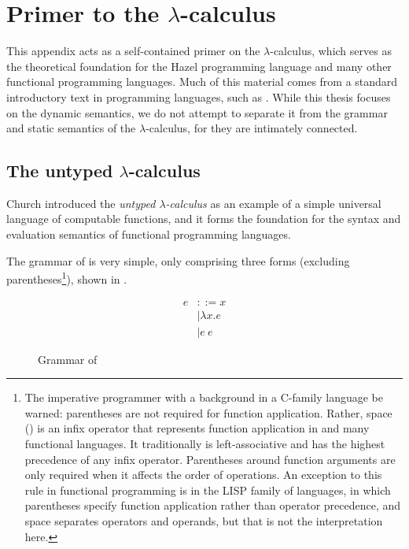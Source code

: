 \chapter{Primer to the $\lambda$-calculus}
\label{sec:lambda-calculus-primer}

This appendix acts as a self-contained primer on the $\lambda$-calculus, which serves as the theoretical foundation for the Hazel programming language and many other functional programming languages. Much of this material comes from a standard introductory text in programming languages, such as \cite{harper2016practical}. While this thesis focuses on the dynamic semantics, we do not attempt to separate it from the grammar and static semantics of the $\lambda$-calculus, for they are intimately connected.

\section{The untyped $\lambda$-calculus}
\label{sec:lambda-calculus}

Church introduced the \textit{untyped $\lambda$-calculus} \ulc{} as an example of a simple universal language of computable functions, and it forms the foundation for the syntax and evaluation semantics of functional programming languages.

The grammar of \ulc{} is very simple, only comprising three forms (excluding parentheses\footnote{The imperative programmer with a background in a C-family language be warned: parentheses are not required for function application. Rather, space (\textvisiblespace) is an infix operator that represents function application in \ulc{} and many functional languages. It traditionally is left-associative and has the highest precedence of any infix operator. Parentheses around function arguments are only required when it affects the order of operations. An exception to this rule in functional programming is in the LISP family of languages, in which parentheses specify function application rather than operator precedence, and space separates operators and operands, but that is not the interpretation here.}), shown in .

\begin{figure}
  \centering
  \begin{mdframed}
    \begin{singlespace}
      \begin{align*}
        e &::= x\tag{variable}\\
          &\mid \lambda x.e\tag{$\lambda$-abstraction}\\
          &\mid e\ e\tag{function application}
      \end{align*}
    \end{singlespace}
  \end{mdframed}
  \caption{Grammar of \ulc}
  \label{fig:syntax-ulc}
\end{figure}

